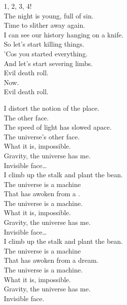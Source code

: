1, 2, 3, 4! \\

The night is young, full of sin. \\
Time to slither away again. \\
I can see our history hanging on a knife. \\

So let's start killing things. \\
'Cos you started everything. \\
And let's start severing limbs. \\

Evil death roll. \\
Now. \\
Evil death roll. \\




I distort the notion of the place. \\
The  other face. \\
The speed of light has slowed apace. \\
The universe's other face. \\

What it is, impossible. \\
Gravity, the universe has me. \\
Invisible face… \\

I climb up the stalk and plant the bean. \\
The universe is a machine \\
That has awoken from a . \\
The universe is a machine. \\

What it is, impossible. \\
Gravity, the universe has me. \\
Invisible face… \\

I climb up the stalk and plant the bean. \\
The universe is a machine \\
That has awoken from a dream. \\
The universe is a machine. \\

What it is, impossible. \\
Gravity, the universe has me. \\
Invisible face. \\

